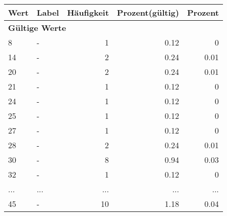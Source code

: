      \begin{longtable}{lXrrr}
     \toprule
     \textbf{Wert} & \textbf{Label} & \textbf{Häufigkeit} & \textbf{Prozent(gültig)} & \textbf{Prozent} \\
     \endhead
     \midrule
     \multicolumn{5}{l}{\textbf{Gültige Werte}}\\
        8 & \multicolumn{1}{X}{-} & %
          \num{1} &
          \num[round-mode=places,round-precision=2]{0,12} &
          \num[round-mode=places,round-precision=2]{0} \\
        14 & \multicolumn{1}{X}{-} & %
          \num{2} &
          \num[round-mode=places,round-precision=2]{0,24} &
          \num[round-mode=places,round-precision=2]{0,01} \\
        20 & \multicolumn{1}{X}{-} & %
          \num{2} &
          \num[round-mode=places,round-precision=2]{0,24} &
          \num[round-mode=places,round-precision=2]{0,01} \\
        21 & \multicolumn{1}{X}{-} & %
          \num{1} &
          \num[round-mode=places,round-precision=2]{0,12} &
          \num[round-mode=places,round-precision=2]{0} \\
        24 & \multicolumn{1}{X}{-} & %
          \num{1} &
          \num[round-mode=places,round-precision=2]{0,12} &
          \num[round-mode=places,round-precision=2]{0} \\
        25 & \multicolumn{1}{X}{-} & %
          \num{1} &
          \num[round-mode=places,round-precision=2]{0,12} &
          \num[round-mode=places,round-precision=2]{0} \\
        27 & \multicolumn{1}{X}{-} & %
          \num{1} &
          \num[round-mode=places,round-precision=2]{0,12} &
          \num[round-mode=places,round-precision=2]{0} \\
        28 & \multicolumn{1}{X}{-} & %
          \num{2} &
          \num[round-mode=places,round-precision=2]{0,24} &
          \num[round-mode=places,round-precision=2]{0,01} \\
        30 & \multicolumn{1}{X}{-} & %
          \num{8} &
          \num[round-mode=places,round-precision=2]{0,94} &
          \num[round-mode=places,round-precision=2]{0,03} \\
        32 & \multicolumn{1}{X}{-} & %
          \num{1} &
          \num[round-mode=places,round-precision=2]{0,12} &
          \num[round-mode=places,round-precision=2]{0} \\
       ... & ... & ... & ... & ... \\
        45 & \multicolumn{1}{X}{-} & %
          \num{10} &
          \num[round-mode=places,round-precision=2]{1,18} &
          \num[round-mode=places,round-precision=2]{0,04} \\


\end{longtable}
